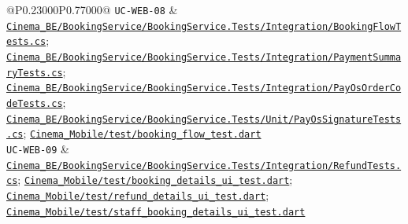 \begin{longtable}{@{}P{0.23000\SRSWidth}P{0.77000\SRSWidth}@{}}
\texttt{UC-\allowbreak{}WEB-\allowbreak{}08} & \href{../../../Cinema\_BE/BookingService/BookingService.Tests/Integration/BookingFlowTests.cs}{\texttt{Cinema\_\allowbreak{}BE/\allowbreak{}Booking\allowbreak{}Service/\allowbreak{}Booking\allowbreak{}Service.\allowbreak{}Tests/\allowbreak{}Integrat\allowbreak{}ion/\allowbreak{}Booking\allowbreak{}Flow\allowbreak{}Tests.\allowbreak{}cs}}; \href{../../../Cinema\_BE/BookingService/BookingService.Tests/Integration/PaymentSummaryTests.cs}{\texttt{Cinema\_\allowbreak{}BE/\allowbreak{}Booking\allowbreak{}Service/\allowbreak{}Booking\allowbreak{}Service.\allowbreak{}Tests/\allowbreak{}Integrat\allowbreak{}ion/\allowbreak{}Payment\allowbreak{}Summary\allowbreak{}Tests.\allowbreak{}cs}}; \href{../../../Cinema\_BE/BookingService/BookingService.Tests/Integration/PayOsOrderCodeTests.cs}{\texttt{Cinema\_\allowbreak{}BE/\allowbreak{}Booking\allowbreak{}Service/\allowbreak{}Booking\allowbreak{}Service.\allowbreak{}Tests/\allowbreak{}Integrat\allowbreak{}ion/\allowbreak{}Pay\allowbreak{}Os\allowbreak{}Order\allowbreak{}Code\allowbreak{}Tests.\allowbreak{}cs}}; \href{../../../Cinema\_BE/BookingService/BookingService.Tests/Unit/PayOsSignatureTests.cs}{\texttt{Cinema\_\allowbreak{}BE/\allowbreak{}Booking\allowbreak{}Service/\allowbreak{}Booking\allowbreak{}Service.\allowbreak{}Tests/\allowbreak{}Unit/\allowbreak{}Pay\allowbreak{}Os\allowbreak{}Signatur\allowbreak{}e\allowbreak{}Tests.\allowbreak{}cs}}; \href{../../../Cinema\_Mobile/test/booking\_flow\_test.dart}{\texttt{Cinema\_\allowbreak{}Mobile/\allowbreak{}test/\allowbreak{}booking\_\allowbreak{}flow\_\allowbreak{}test.\allowbreak{}dart}} \\[3pt]
\texttt{UC-\allowbreak{}WEB-\allowbreak{}09} & \href{../../../Cinema\_BE/BookingService/BookingService.Tests/Integration/RefundTests.cs}{\texttt{Cinema\_\allowbreak{}BE/\allowbreak{}Booking\allowbreak{}Service/\allowbreak{}Booking\allowbreak{}Service.\allowbreak{}Tests/\allowbreak{}Integrat\allowbreak{}ion/\allowbreak{}Refund\allowbreak{}Tests.\allowbreak{}cs}}; \href{../../../Cinema\_Mobile/test/booking\_details\_ui\_test.dart}{\texttt{Cinema\_\allowbreak{}Mobile/\allowbreak{}test/\allowbreak{}booking\_\allowbreak{}details\_\allowbreak{}ui\_\allowbreak{}test.\allowbreak{}dart}}; \href{../../../Cinema\_Mobile/test/refund\_details\_ui\_test.dart}{\texttt{Cinema\_\allowbreak{}Mobile/\allowbreak{}test/\allowbreak{}refund\_\allowbreak{}details\_\allowbreak{}ui\_\allowbreak{}test.\allowbreak{}dart}}; \href{../../../Cinema\_Mobile/test/staff\_booking\_details\_ui\_test.dart}{\texttt{Cinema\_\allowbreak{}Mobile/\allowbreak{}test/\allowbreak{}staff\_\allowbreak{}booking\_\allowbreak{}details\_\allowbreak{}ui\_\allowbreak{}test.\allowbreak{}dart}} \\[3pt]

\end{longtable}
